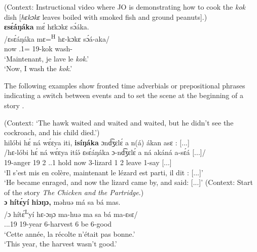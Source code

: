 \documentclass[output=paper,colorlinks,citecolor=brown
]{langscibook}
\begin{document}
\z

\ea
\label{cookkoknow}
(Context: Instructional video where JO is demonstrating how to cook the \textit{kok} dish [\textit{hɛkɔkɛ} leaves boiled with smoked fish and ground peanuts].) \\ 
\glll
{\db}\textbf{ɛsɛ́áŋáka} mɛ́ hɛkɔkɛ sɔ́áka. \\
/ɛsɛ́áŋáka mɛ=\textsuperscript{H} hɛ-kɔkɛ sɔ́á-aka/ \\
{\db}now \SM{}.1\SG{}=\PROC{} 19-kok wash-\DUR{} \\
\glt
`Maintenant, je lave le \textit{kok}.' \\ `Now, I wash the \textit{kok}.' \jambox*{[JO 1343] }

\z

The following examples show fronted time adverbials or prepositional phrases indicating a switch between events  and to set the scene at the beginning of a story .

\ea
\label{angerhawk}
(Context: `The hawk waited and waited and waited, but he didn't see the cockroach, and his child died.') \\ 
\glll
{\db}hilóbi hɛ́ ná wɛ́ɛya iti, \textbf{isíŋáka} ɔnd͡ʒɛlɛ́ a n(á) ákan asɛ : [...] \\
/hɛ-lóbi hɛ́ ná wɛ́ɛya itíə́ ɛsɛ́áŋáka ɔ-nd͡ʒɛlɛ́ a ná akáná a-sɛ́á [...]/ \\
{\db}19-anger 19\SM{} \PST{}2{} \PRO{}.\EMPH{}.1{} hold now 3-lizard 1\SM{} \PST{}2 leave 1\SM{}-say [...] \\
\glt
`Il s'est mis en colère, maintenant le lézard est parti, il dit : [...]' \\ `He became enraged, and now the lizard came by, and said: [...]' \jambox*{[JO 2063] }
\z
\ea
\label{chickenpartridgebeginning}
(Context: Start of the story \textit{The Chicken and the Partridge}.) \\ 
\glll
{\db}\textbf{ɔ} \textbf{hí\ds{}tɛ́yí} \textbf{hiɔŋɔ,} məhuə má sa bá mas. \\
/ɔ hítɛ́\textsuperscript{L}yí hɛ-ɔŋɔ ma-huə ma sa bá ma-ɛsɛ/ \\
{\db}\PREP{} \DEM{}.\DISC{}.\EMPH{}.19{} 19-year 6-harvest 6\SM{} \NEG{} be 6-good \\
\glt
`Cette année, la récolte n'était pas bonne.' \\ `This year, the harvest wasn't good.' \jambox*{[JO 1744] }
\end{document}

